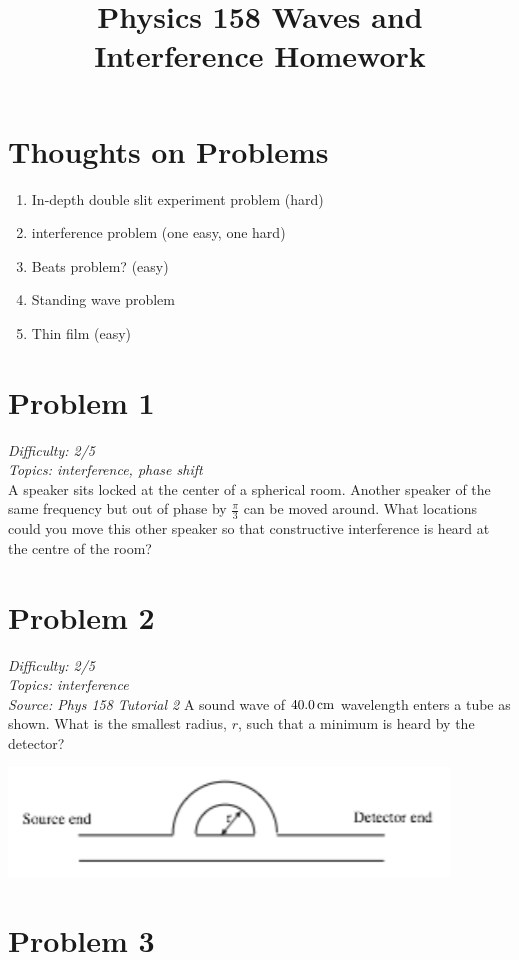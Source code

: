 \documentclass[11pt, fleqn]{article}
\title{Physics 158 Waves and Interference Homework}
\author{}
\date{}
\begin{document}
\allowdisplaybreaks

\maketitle

\section*{Thoughts on Problems}
\begin{enumerate}
    \item In-depth double slit experiment problem (hard)
    \item interference problem (one easy, one hard)
    \item Beats problem? (easy)
    \item Standing wave problem
    \item Thin film (easy)
\end{enumerate}

\section*{Problem 1}
\textit{Difficulty: 2/5}\\
\textit{Topics: interference, phase shift}\\
A speaker sits locked at the center of a spherical room. Another speaker
of the same frequency but out of phase by $\frac{\pi}{3}$ can be moved around. 
What locations could you move this other speaker so that constructive interference is
heard at the centre of the room?

\section*{Problem 2}
\textit{Difficulty: 2/5}\\
\textit{Topics: interference}\\
\textit{Source: Phys 158 Tutorial 2}
A sound wave of $40.0\,\mathrm{cm}$ wavelength enters a tube as shown. What is the
smallest radius, $r$, such that a minimum is heard by the detector?\\
\centerline{\includegraphics{Images/InterferenceTube.png}}

\section*{Problem 3}
\end{document}
